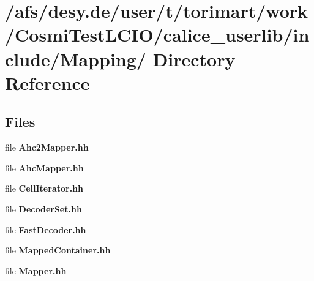 \section{/afs/desy.de/user/t/torimart/work/CosmiTestLCIO/calice\_\-userlib/include/Mapping/ Directory Reference}
\label{dir_5c6df5fb33f97ab441a1c2f4eff4b5dd}
\subsection*{Files}
\begin{DoxyCompactItemize}
\item 
file {\bfseries Ahc2Mapper.hh}
\item 
file {\bfseries AhcMapper.hh}
\item 
file {\bfseries CellIterator.hh}
\item 
file {\bfseries DecoderSet.hh}
\item 
file {\bfseries FastDecoder.hh}
\item 
file {\bfseries MappedContainer.hh}
\item 
file {\bfseries Mapper.hh}
\end{DoxyCompactItemize}
